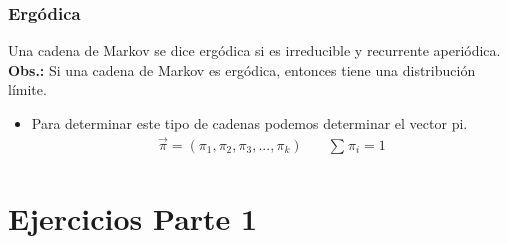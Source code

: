 \documentclass{templateNote}
\begin{document}
\subsubsection{Ergódica}
\noindent Una cadena de Markov se dice ergódica si es irreducible y recurrente aperiódica.\\
\textbf{Obs.:} Si una cadena de Markov es ergódica, entonces tiene una distribución límite.
\begin{itemize}
    \item Para determinar este tipo de cadenas podemos determinar el vector pi.
    \begin{align*}
        \vec{\pi} = (\pi_1, \pi_2, \pi_3, ..., \pi_k)  \quad &  \sum_{}^{}\pi_i = 1
    \end{align*}
\end{itemize}

\newpage
\section{Ejercicios Parte 1}
\end{document}
